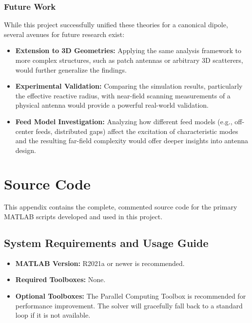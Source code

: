\documentclass[11pt, a4paper]{report}
\begin{document}
\subsection{Future Work}
While this project successfully unified these theories for a canonical dipole, several avenues for future research exist:
\begin{itemize}
    \item \textbf{Extension to 3D Geometries:} Applying the same analysis framework to more complex structures, such as patch antennas or arbitrary 3D scatterers, would further generalize the findings.
    \item \textbf{Experimental Validation:} Comparing the simulation results, particularly the effective reactive radius, with near-field scanning measurements of a physical antenna would provide a powerful real-world validation.
    \item \textbf{Feed Model Investigation:} Analyzing how different feed models (e.g., off-center feeds, distributed gaps) affect the excitation of characteristic modes and the resulting far-field complexity would offer deeper insights into antenna design.
\end{itemize}

\newpage

\appendix

\chapter{Source Code} \label{app:code}
This appendix contains the complete, commented source code for the primary MATLAB scripts developed and used in this project.

\section{System Requirements and Usage Guide}
\begin{itemize}
    \item \textbf{MATLAB Version:} R2021a or newer is recommended.
    \item \textbf{Required Toolboxes:} None.
    \item \textbf{Optional Toolboxes:} The Parallel Computing Toolbox is recommended for performance improvement. The solver will gracefully fall back to a standard loop if it is not available.
\end{itemize}
\end{document}

